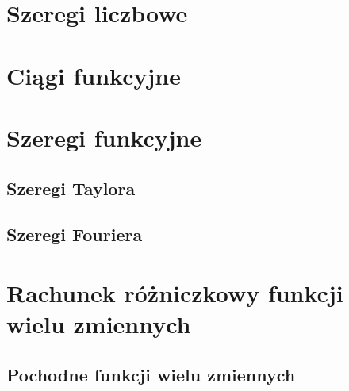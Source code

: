\documentclass[11pt]{scrartcl}
\begin{document}
    \section{Szeregi liczbowe}
    

    \section{Ciągi funkcyjne}
    

    \section{Szeregi funkcyjne}
    
        \subsection{Szeregi Taylora}
        
        \subsection{Szeregi Fouriera}
        


    \section{Rachunek różniczkowy funkcji wielu zmiennych}
    
        \subsection{Pochodne funkcji wielu zmiennych}
        

\end{document}
